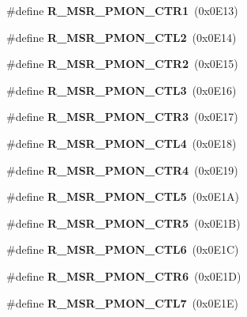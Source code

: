 \begin{DoxyCompactItemize}
\item 
\#define {\bfseries R\+\_\+\+M\+S\+R\+\_\+\+P\+M\+O\+N\+\_\+\+C\+T\+R1}~(0x0\+E13)\label{types_8h_a582c8c015836e8dc390d7f2aca275275}

\item 
\#define {\bfseries R\+\_\+\+M\+S\+R\+\_\+\+P\+M\+O\+N\+\_\+\+C\+T\+L2}~(0x0\+E14)\label{types_8h_acf75418036ae39a09749cf220e8852ac}

\item 
\#define {\bfseries R\+\_\+\+M\+S\+R\+\_\+\+P\+M\+O\+N\+\_\+\+C\+T\+R2}~(0x0\+E15)\label{types_8h_a2565d3aa63c53f8c762a8bbca6ae5557}

\item 
\#define {\bfseries R\+\_\+\+M\+S\+R\+\_\+\+P\+M\+O\+N\+\_\+\+C\+T\+L3}~(0x0\+E16)\label{types_8h_a03516d9b5b9b1a01487b66183cd05e4f}

\item 
\#define {\bfseries R\+\_\+\+M\+S\+R\+\_\+\+P\+M\+O\+N\+\_\+\+C\+T\+R3}~(0x0\+E17)\label{types_8h_ad0eae26f39eb1bce7640d6fcbeffdd78}

\item 
\#define {\bfseries R\+\_\+\+M\+S\+R\+\_\+\+P\+M\+O\+N\+\_\+\+C\+T\+L4}~(0x0\+E18)\label{types_8h_ad12afe1f2cbdde949fc5e627458eb8ad}

\item 
\#define {\bfseries R\+\_\+\+M\+S\+R\+\_\+\+P\+M\+O\+N\+\_\+\+C\+T\+R4}~(0x0\+E19)\label{types_8h_ab3524046d5822fed0e47828d20acc3e9}

\item 
\#define {\bfseries R\+\_\+\+M\+S\+R\+\_\+\+P\+M\+O\+N\+\_\+\+C\+T\+L5}~(0x0\+E1\+A)\label{types_8h_a394018738b4fdd7e6a794db59bd74fab}

\item 
\#define {\bfseries R\+\_\+\+M\+S\+R\+\_\+\+P\+M\+O\+N\+\_\+\+C\+T\+R5}~(0x0\+E1\+B)\label{types_8h_a9a14e26164ee41a8d3976b1fbc71607f}

\item 
\#define {\bfseries R\+\_\+\+M\+S\+R\+\_\+\+P\+M\+O\+N\+\_\+\+C\+T\+L6}~(0x0\+E1\+C)\label{types_8h_a68cc99e6775534a5cb0ecedf899a6603}

\item 
\#define {\bfseries R\+\_\+\+M\+S\+R\+\_\+\+P\+M\+O\+N\+\_\+\+C\+T\+R6}~(0x0\+E1\+D)\label{types_8h_a0bc6e0e035540942d0389ad21f4a410f}

\item 
\#define {\bfseries R\+\_\+\+M\+S\+R\+\_\+\+P\+M\+O\+N\+\_\+\+C\+T\+L7}~(0x0\+E1\+E)\label{types_8h_a3b7d38eb7ebbc05767c7529b58e5b88d}


\end{DoxyCompactItemize}
